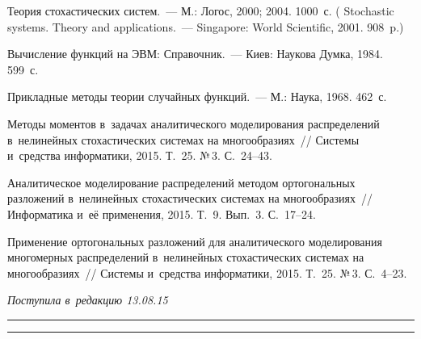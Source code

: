 \begin{multicols}{2}
{{\begin{thebibliography}{99}
Теория стохастических систем.~--- М.: Логос, 2000; 2004. 1000~с.
( Stochastic systems. Theory and  applications.~---
Singapore: World Scientific, 2001. 908~p.)

Вычисление функций на ЭВМ: Справочник.~--- Киев: Наукова Думка, 1984. 599~с.

Прикладные методы теории случайных функций.~--- М.: Наука, 1968. 462~с.

Методы моментов в~задачах аналитического моделирования распределений 
в~нелинейных стохастических системах на многообразиях~// Системы и~средства 
информатики, 2015. Т.~25. №\,3. С.~24--43.

Аналитическое моделирование распределений методом ортогональных разложений 
в~нелинейных стохастических системах на многообразиях~// Информатика и~её 
применения, 2015. Т.~9. Вып.~3. С.~17--24.

Применение ортогональных разложений для аналитического моделирования 
многомерных распределений в~нелинейных стохастических системах на многообразиях~// 
Системы и~средства информатики, 2015. Т.~25. №\,3. С.~4--23. 
     \end{thebibliography}

 }
 }

\end{multicols}

\vspace*{-12pt}

\hfill{\small\textit{Поступила в~редакцию 13.08.15}}

\vspace*{8pt}



\hrule

\vspace*{2pt}

\hrule


\def\tit{ANALYTICAL MODELING OF PROCESSES
IN~DYNAMICAL SYSTEMS WITH CYLINDRIC
BESSEL NONLINEARITIES}

\def\titkol{Analytical modeling of processes
in~dynamical systems with cylindric
Bessel nonlinearities}

